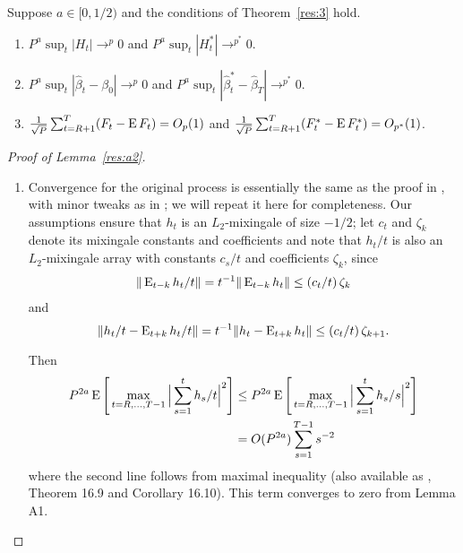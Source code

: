 \documentclass[12pt,fleqn]{article}
\begin{document}
\begin{lema}\label{res:a2}
  Suppose $a \in [0,1/2)$ and the conditions of Theorem~\ref{res:3}
  hold.
  \begin{enumerate}
  \item $P^a \sup_t | H_{t} | \to^p 0$ and $P^a \sup_t | H_{t}^{*} |
    \to^{p^{*}} 0$.
  \item $P^a \sup_t | \hat{\beta}_{t} - \beta_{0} | \to^{p} 0$ and
    $P^a \sup_t | \hat{\beta}^{*}_{t} - \hat{\beta}_T |
    \to^{p^{*}} 0$.
  \item $\tfrac{1}{\sqrt{P}} \sum_{t=R+1}^T (F_t - \operatorname{E} F_t) = O_{p}(1)$
    and $\tfrac{1}{\sqrt{P}} \sum_{t=R+1}^T (F_t^* - \operatorname{E} F_t^*) =
    O_{p^*}(1)$.
  \end{enumerate}
\end{lema}

\begin{proof}[Proof of Lemma~\ref{res:a2}]
  \begin{enumerate}
  \item Convergence for the original process is essentially the same
    as the proof in \citet{Wes:96}, with minor tweaks as in
    \citet{Cal:15}; we will repeat it here for completeness. Our
    assumptions ensure that $h_t$ is an $L_2$-mixingale of size $-1/2$;
    let $c_t$ and $\zeta_k$ denote its mixingale constants and
    coefficients and note that $h_t/t$ is also an $L_2$-mixingale array
    with constants $c_s/t$ and coefficients $\zeta_k$, since
    \begin{align*}
      \| \operatorname{E}_{t-k} h_t / t \| = t^{-1} \| \operatorname{E}_{t-k} h_t \| \leq (c_t/t)\, \zeta_k
    \end{align*}
    and
    \begin{equation*}
      \| h_t/t - \operatorname{E}_{t+k} h_t/t \| = t^{-1} \|  h_t - \operatorname{E}_{t+k} h_t \| \leq (c_t/t)\, \zeta_{k+1}.
    \end{equation*}

    Then
    \begin{align*}
      P^{2a} \operatorname{E}\Bigg[\max_{t=R,\dots,T-1} \Big| \sum_{s=1}^t h_s/t \Big|^2\Bigg]
      &\leq P^{2a} \operatorname{E}\Bigg[\max_{t=R,\dots,T-1} \Big| \sum_{s=1}^t h_s/s \Big|^2\Bigg] \\
      &= O(P^{2a}) \sum_{s=1}^{T-1} s^{-2}
    \end{align*}
    where the second line follows from  maximal
    inequality (also available as \citealp{Dav:94}, Theorem 16.9 and
    Corollary 16.10). This term converges to zero from  Lemma A1.


\end{enumerate}
\end{proof}
\end{document}
